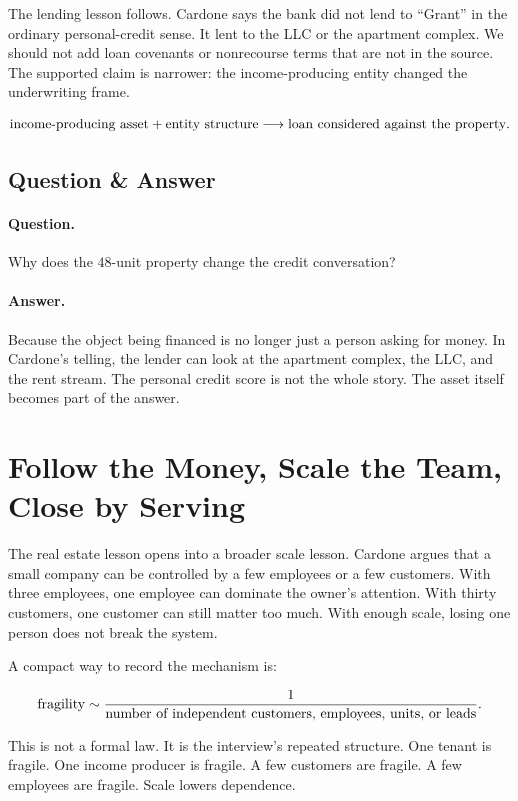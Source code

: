 The lending lesson follows. Cardone says the bank did not lend to ``Grant'' in the ordinary personal-credit sense. It lent to the LLC or the apartment complex. We should not add loan covenants or nonrecourse terms that are not in the source. The supported claim is narrower: the income-producing entity changed the underwriting frame.

\[
\hbox{income-producing asset}
+
\hbox{entity structure}
\longrightarrow
\hbox{loan considered against the property}.
\]

\subsection{Question \& Answer}

\paragraph{Question.} Why does the \(48\)-unit property change the credit conversation?

\paragraph{Answer.} Because the object being financed is no longer just a person asking for money. In Cardone's telling, the lender can look at the apartment complex, the LLC, and the rent stream. The personal credit score is not the whole story. The asset itself becomes part of the answer.

\section{Follow the Money, Scale the Team, Close by Serving}

The real estate lesson opens into a broader scale lesson. Cardone argues that a small company can be controlled by a few employees or a few customers. With three employees, one employee can dominate the owner's attention. With thirty customers, one customer can still matter too much. With enough scale, losing one person does not break the system.

A compact way to record the mechanism is:

\[
\hbox{fragility}
\sim
\frac{1}{\hbox{number of independent customers, employees, units, or leads}}.
\]

This is not a formal law. It is the interview's repeated structure. One tenant is fragile. One income producer is fragile. A few customers are fragile. A few employees are fragile. Scale lowers dependence.

